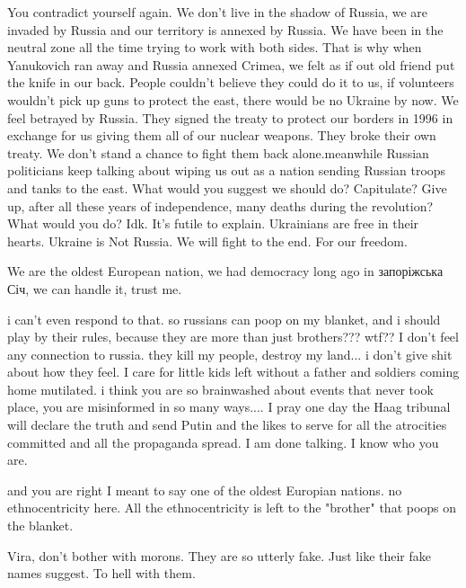 \begin{itemize}
\begin{itemize}

You contradict yourself again. We don't live in the shadow of Russia, we are
invaded by Russia and our territory is annexed by Russia. We have been in the
neutral zone all the time trying to work with both sides. That is why when
Yanukovich ran away and Russia annexed Crimea, we felt as if out old friend put
the knife in our back. People couldn't believe they could do it to us, if
volunteers wouldn't pick up guns to protect the east, there would be no Ukraine
by now. We feel betrayed by Russia. They signed the treaty to protect our
borders in 1996 in exchange for us giving them all of our nuclear weapons. They
broke their own treaty. We don't stand a chance to fight them back
alone.meanwhile Russian politicians keep talking about wiping us out as a
nation sending Russian troops and tanks to the east. What would you suggest we
should do? Capitulate? Give up, after all these years of independence, many
deaths during the revolution? What would you do? Idk. It's futile to explain.
Ukrainians are free in their hearts. Ukraine is Not Russia. We will fight to
the end. For our freedom.


We are the oldest European nation, we had democracy long ago in запоріжська
Січ, we can handle it, trust me.


i can't even respond to that. so russians can poop on my blanket, and i should
play by their rules, because they are more than just brothers??? wtf?? I don't
feel any connection to russia. they kill my people, destroy my land... i don't
give shit about how they feel. I care for little kids left without a father and
soldiers coming home mutilated. i think you are so brainwashed about events
that never took place, you are misinformed in so many ways.... I pray one day
the Haag tribunal will declare the truth and send Putin and the likes to serve
for all the atrocities committed and all the propaganda spread. I am done
talking. I know who you are.


and you are right I meant to say one of the oldest Europian nations. no
ethnocentricity here. All the ethnocentricity is left to the "brother" that
poops on the blanket.


Vira, don't bother with morons. They are so utterly fake. Just like their fake
names suggest. To hell with them.


\end{itemize}
\end{itemize}
